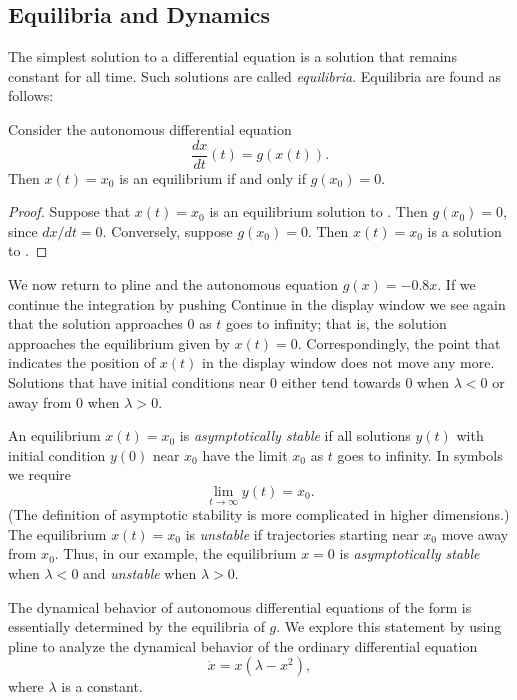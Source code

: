 \documentclass{ximera}
\begin{document}
\subsection*{Equilibria and Dynamics}

The simplest solution to a differential equation is a solution
that remains constant for all time.  Such solutions are called
{\em equilibria\/}.  Equilibria are found as follows:
\begin{lemma}  \label{L:equilibria}
Consider the autonomous  differential equation
\begin{equation} \label{aut}
\frac{dx}{dt}(t) = g(x(t)).
\end{equation}
Then $x(t)=x_0$ is an equilibrium  if and only
if $g(x_0)=0$.
\end{lemma}

\begin{proof} Suppose that $x(t)=x_0$ is an equilibrium solution to
. Then $g(x_0)=0$, since $dx/dt = 0$.  Conversely,
suppose $g(x_0)=0$.  Then $x(t)=x_0$ is a solution to .
\end{proof}

We now return to {\sf pline} and the autonomous equation
$g(x)=-0.8x$.  If we continue the integration by pushing {\sf
Continue} in the display window we see again that the solution
approaches $0$ as $t$ goes to infinity; that is, the solution
approaches the equilibrium given by $x(t)=0$.  Correspondingly,
the point that indicates the position of $x(t)$ in the display
window does not move any more.  Solutions that have initial
conditions near $0$ either tend towards $0$ when $\lambda <
0$ or away from $0$ when $\lambda> 0$.

An equilibrium $x(t)=x_0$ is {\em asymptotically stable\/}
 if all solutions $y(t)$ with
initial condition $y(0)$ near $x_0$ have the limit
$x_0$ as $t$ goes to infinity.  In symbols we require
\[
\lim_{t\to\infty} y(t) = x_0.
\]
(The definition of asymptotic stability is more complicated in
higher dimensions.) The equilibrium $x(t)=x_0$ is {\em unstable\/}
 if trajectories starting near $x_0$ move away
from $x_0$.  Thus, in
our example, the equilibrium $x=0$ is {\em asymptotically
stable\/} when $\lambda< 0$ and {\em unstable\/}
when $\lambda> 0$.

The dynamical behavior of autonomous differential equations of
the form  is essentially determined by the equilibria
of $g$.  We explore this statement by using {\sf pline} to
analyze the dynamical behavior of the ordinary differential
equation
\begin{equation} \label{pitch_eq}
	\dot{x} = x(\lambda-x^2),
\end{equation}
where $\lambda$ is a constant.  
\end{document}

